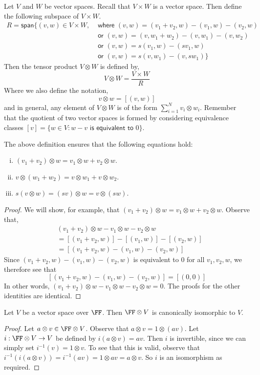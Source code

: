 \begin{defn}
Let $V$ and $W$ be vector spaces. Recall that $V\times W$ is a vector space. Then define the following subspace of $V\times W$.
\begin{align*}R = \textsf{span} \Bigg\{(v,w) \in V\times W, &\textsf{ where }
 (v,w) = (v_1+v_2,w)-(v_1,w)-(v_2,w)\\
&\textsf{ or }(v,w) = (v,w_1+w_2)-(v,w_1)-(v,w_2)\\
&\textsf{ or }(v,w) = s(v_1,w) - (sv_1,w)\\
&\textsf{ or }(v,w) = s(v,w_1) - (v,sw_1)
\Bigg\}
\end{align*}
Then the tensor product $V\otimes W$ is defined by,
\[V \otimes W = \frac{V\times W}{R}\]
Where we also define the notation,
\[v \otimes w = [(v,w)]\]
and in general, any element of $V \otimes W$ is of the form $\sum_{i=1}^N v_i \otimes w_i$.
Remember that the quotient of two vector spaces is formed by considering equivalence classes $[v] =\{w \in V : w - v \textsf{ is equivalent to } 0\}$. 
\end{defn}
\begin{thm}
    The above definition ensures that the following equations hold:
\begin{enumerate}[i.]
\item {
$(v_1+v_2)\otimes w = v_1\otimes w + v_2\otimes w$.
}
\item {
$v\otimes (w_1+w_2) = v\otimes w_1 + v\otimes w_2$.
}
\item {
$s(v\otimes w) = (sv)\otimes w = v\otimes (sw)$.
}
\end{enumerate}
\end{thm}
\begin{proof}
We will show, for example, that
$(v_1+v_2)\otimes w = v_1\otimes w + v_2\otimes w$. Observe that,
\begin{align*}
    &(v_1+v_2)\otimes w - v_1\otimes w - v_2\otimes w \\
    &= [(v_1+v_2,w)] - [(v_1,w)] - [(v_2,w)]\\
    &= [(v_1+v_2,w)-(v_1,w)-(v_2,w)]
\end{align*}
Since $(v_1+v_2,w)-(v_1,w)-(v_2,w)$ is equivalent to $0$ for all $v_1,v_2,w$, we therefore see that 
\[[(v_1+v_2,w)-(v_1,w)-(v_2,w)] = [(0,0)]\] 
In other words, $(v_1+v_2)\otimes w - v_1\otimes w - v_2\otimes w = 0$. The proofs for the other identities are identical.
\end{proof}
\begin{lemma}
Let $V$ be a vector space over $\FF$. Then $\FF \otimes V$ is canonically isomorphic to $V$.   
\end{lemma}
\begin{proof}
    Let $a \otimes v \in \FF \otimes V$. Observe that $a \otimes v = 1 \otimes (av)$. Let $i : \FF \otimes V \to V$ be defined by $i(a\otimes v) = av$. Then $i$ is invertible, since we can simply set $i^{-1}(v) = 1\otimes v$. To see that this is valid, observe that $i^{-1}(i(a\otimes v)) = i^{-1}(av) = 1\otimes av = a \otimes v$. So $i$ is an isomorphism as required.
\end{proof}


